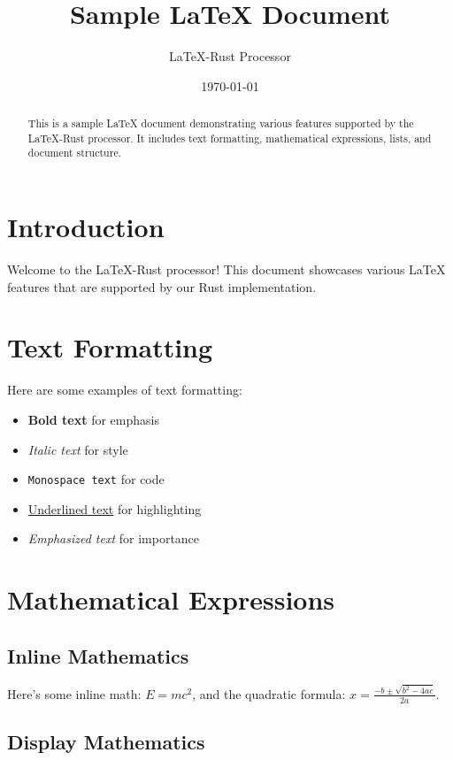 \documentclass{article}
\title{Sample LaTeX Document}
\author{LaTeX-Rust Processor}
\date{\today}
\begin{document}
\maketitle

\begin{abstract}
This is a sample LaTeX document demonstrating various features supported by the LaTeX-Rust processor. It includes text formatting, mathematical expressions, lists, and document structure.
\end{abstract}

\section{Introduction}

Welcome to the LaTeX-Rust processor! This document showcases various LaTeX features that are supported by our Rust implementation.

\section{Text Formatting}

Here are some examples of text formatting:

\begin{itemize}
\item \textbf{Bold text} for emphasis
\item \textit{Italic text} for style
\item \texttt{Monospace text} for code
\item \underline{Underlined text} for highlighting
\item \emph{Emphasized text} for importance
\end{itemize}

\section{Mathematical Expressions}

\subsection{Inline Mathematics}

Here's some inline math: $E = mc^2$, and the quadratic formula: $x = \frac{-b \pm \sqrt{b^2 - 4ac}}{2a}$.

\subsection{Display Mathematics}
\end{document}
